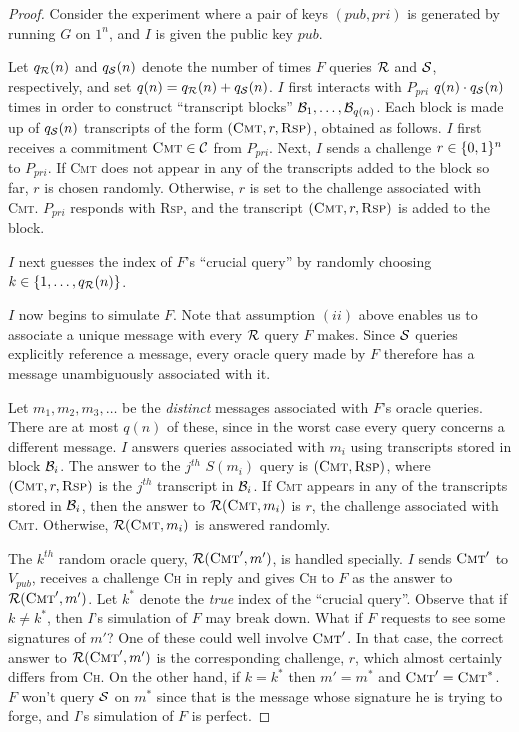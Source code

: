\documentclass[12pt,twoside]{article}
\begin{document}
\begin{proof}
\medskip\noindent
Consider the experiment where a pair of keys $(pub,pri)$ is generated by
running $G$ on $1^n$, and $I$ is given the public key $pub$.

\medskip\noindent
Let $q_{\mathcal{R}}(n)$ and $q_{\mathcal{S}}(n)$ denote the number of times $F$ queries 
$\mathcal{R}$ and $\mathcal{S}$, respectively, and set $q(n) = q_{\mathcal{R}}(n) + q_{\mathcal{S}}(n)$. 
$I$ first interacts with $P_{pri}$ $q(n)\cdot q_{\mathcal{S}}(n)$ times in order to 
construct ``transcript blocks'' $\mathcal{B}_1,\ldots,\mathcal{B}_{q(n)}$. Each 
block is made up of $q_{\mathcal{S}}(n)$ transcripts of the form 
$(\textsc{Cmt},r,\textsc{Rsp})$, obtained as follows. $I$ first receives a 
commitment $\textsc{Cmt} \in \mathcal{C}$ from $P_{pri}$. Next, $I$ sends a 
challenge $r \in \{0,1\}^{n}$ to $P_{pri}$. If \textsc{Cmt} does not 
appear in any of the transcripts added to the block so far, $r$ is chosen 
randomly. Otherwise, $r$ is set to the challenge associated with \textsc{Cmt}. 
$P_{pri}$ responds with \textsc{Rsp}, and the transcript 
$(\textsc{Cmt},r,\textsc{Rsp})$ is added to the block.

\medskip\noindent
$I$ next guesses the index of $F$'s ``crucial query'' by randomly choosing
$k \in \{1,\ldots,q_{\mathcal{R}}(n)\}$. 

\medskip\noindent
$I$ now begins to simulate $F$. Note that assumption $(ii)$ above
enables us to associate a unique message with every $\mathcal{R}$ query 
$F$ makes. Since $\mathcal{S}$ queries explicitly reference a message, every oracle
query made by $F$ therefore has a message unambiguously associated with it. 

\medskip\noindent
Let $m_1,m_2,m_3,\ldots$ be the \emph{distinct} messages associated with $F$'s
oracle queries. There are at most $q(n)$ of these, since in the worst case 
every query concerns a different message. $I$ answers queries associated with 
$m_i$ using transcripts stored in block $\mathcal{B}_i$. The answer to the 
$j^{th}$ $S(m_i)$ query is $(\textsc{Cmt},\textsc{Rsp})$, 
where $(\textsc{Cmt},r,\textsc{Rsp})$ is the $j^{th}$ transcript in 
$\mathcal{B}_i$. If \textsc{Cmt} appears in any of the transcripts stored in 
$\mathcal{B}_i$, then the answer to $\mathcal{R}(\textsc{Cmt},m_i)$ is $r$, the 
challenge associated with \textsc{Cmt}. Otherwise, $\mathcal{R}(\textsc{Cmt},m_i)$ 
is answered randomly. 

\medskip\noindent
The $k^{th}$ random oracle query, $\mathcal{R}(\textsc{Cmt}',m')$, is handled 
specially. $I$ sends $\textsc{Cmt}'$ to $V_{pub}$, receives a challenge 
\textsc{Ch} in reply and gives \textsc{Ch} to $F$ as the answer to 
$\mathcal{R}(\textsc{Cmt}',m')$. Let $k^*$ denote
the \emph{true} index of the ``crucial query''. Observe that if  
$k \neq k^*$, then $I$'s simulation of $F$ may break down. What if 
$F$ requests to see some signatures of $m'$? One of these could well  
involve $\textsc{Cmt}'$.
In that case, the correct answer to $\mathcal{R}(\textsc{Cmt}',m')$ is the 
corresponding challenge, $r$, which almost certainly differs from \textsc{Ch}. 
On the other hand, if $k = k^*$ then $m' = m^*$ and $\textsc{Cmt}' =
\textsc{Cmt}^*$. $F$ won't query $\mathcal{S}$ on $m^*$ since that is the message
whose signature he is trying to forge, and $I$'s simulation of $F$ is perfect.


\end{proof}
\end{document}
